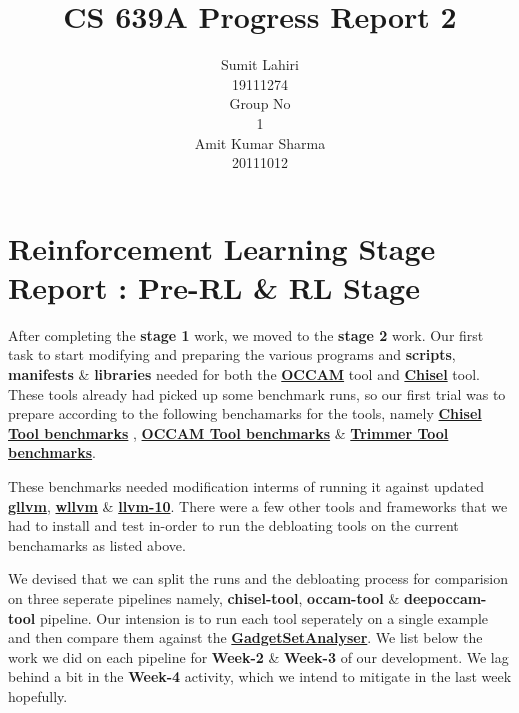 \documentclass{article} %
\title{CS 639A Progress Report 2}
\author{
Sumit Lahiri \\
19111274 \\
\And
Group No\\
1\\
\And
Amit Kumar Sharma \\
20111012\\
}
\begin{document}
\maketitle

\section*{Reinforcement Learning Stage Report : Pre-RL \& RL Stage}
After completing the \textbf{stage 1} work, we moved to the \textbf{stage 2} work. Our first task to start modifying and preparing the various programs and \textbf{scripts}, \textbf{manifests} \& \textbf{libraries} needed for both the \textbf{\href{https://github.com/ashish-gehani/OCCAM}{OCCAM}} tool and \textbf{\href{https://github.com/aspire-project/chisel}{Chisel}} tool. These tools already had picked up some benchmark runs, so our first trial was to prepare according to the following benchamarks for the tools, namely \textbf{\href{https://github.com/lahiri-phdworks/chisel-bench}{Chisel Tool benchmarks}} , \textbf{\href{https://github.com/lahiri-phdworks/OCCAM-Benchmarks}{OCCAM Tool benchmarks}} \& \textbf{\href{https://github.com/ashish-gehani/OCCAM-Benchmarks}{Trimmer Tool benchmarks}}.  

These benchmarks needed modification interms of running it against updated \textbf{\href{https://github.com/SRI-CSL/gllvm}{gllvm}}, \textbf{\href{https://github.com/SRI-CSL/whole-program-llvm}{wllvm}} \& \textbf{\href{https://github.com/lahiri-phdworks/llvm-project/tree/release/10.x}{llvm-10}}. There were a few other tools and frameworks that we had to install and test in-order to run the debloating tools on the current benchamarks as listed above. 

We devised that we can split the runs and the debloating process for comparision on three seperate pipelines namely, \textbf{chisel-tool}, \textbf{occam-tool}
\& \textbf{deepoccam-tool} pipeline. Our intension is to run each tool seperately on a single example and then compare them against the \textbf{\href{https://github.com/michaelbrownuc/GadgetSetAnalyzer}{GadgetSetAnalyser}}. We list below the work we did on each pipeline for \textbf{Week-2} \& \textbf{Week-3} of our development. We lag behind a bit in the \textbf{Week-4} activity, which we intend to mitigate in the last week hopefully. 
\end{document}
